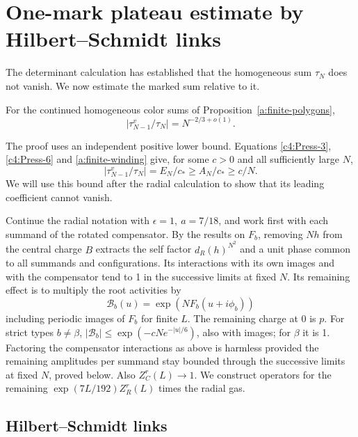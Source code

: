 \section{One-mark plateau estimate by Hilbert--Schmidt links}\label{c4:plateau}

The determinant calculation has established that the homogeneous sum
\(\tau_N\) does not vanish. We now estimate the marked sum relative to it.

\begin{proposition}\label{prop:one-mark-ratio}
For the continued homogeneous color sums of
Proposition~\ref{a:finite-polygons},
\[
                    \big|\tau^v_{N-1}/\tau_N\big|=N^{-2/3+o(1)}.
\]
\end{proposition}

The proof uses an independent positive lower bound. Equations
\eqref{c4:Press-3}, \eqref{c4:Press-6} and \eqref{a:finite-winding} give,
for some \(c>0\) and all sufficiently large \(N\),
\begin{equation}\label{eq:one-mark-positive-input}
 \big|\tau^v_{N-1}/\tau_N\big|=E_N/c_*\ge A_N/c_*\ge c/N.
\end{equation}
We will use this bound after the radial calculation to show that its
leading coefficient cannot vanish.

Continue the radial notation with \(\epsilon=1,\ a=7/18\), and work first
with each summand of the rotated compensator. By the results on \(F_b\),
removing \(Nh\) from the central charge \(B\) extracts the self factor
\(d_R(h)^{N^2}\) and a unit phase common to all summands and configurations.
Its interactions with its own images and with the compensator tend to 1
in the successive limits at fixed \(N\). Its remaining effect is to
multiply the root activities by
\[
 \mathcal B_b(u)=\exp(N F_b(u+i\phi_b))
\]
including periodic images of \(F_b\) for finite \(L\). The remaining charge at 0 is \(p\). For strict types \(b\ne\beta\), \(|\mathcal B_b|\le\exp(-cN e^{-|u|/6})\), also with images; for \(\beta\) it is 1. Factoring the compensator interactions as above is harmless provided the remaining amplitudes per summand stay bounded through the successive limits at fixed \(N\), proved below. Also \(Z_C^r(L)\to1\). We construct operators for the remaining \(\exp(7L/192)Z_R^r(L)\) times the radial gas.

\subsection{Hilbert--Schmidt links}

